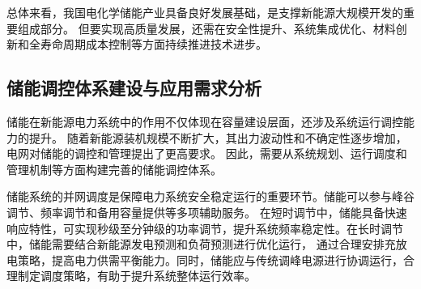 总体来看，我国电化学储能产业具备良好发展基础，是支撑新能源大规模开发的重要组成部分。
但要实现高质量发展，还需在安全性提升、系统集成优化、材料创新和全寿命周期成本控制等方面持续推进技术进步。








\subsection{储能调控体系建设与应用需求分析}

储能在新能源电力系统中的作用不仅体现在容量建设层面，还涉及系统运行调控能力的提升。
随着新能源装机规模不断扩大，其出力波动性和不确定性逐步增加，电网对储能的调控和管理提出了更高要求。
因此，需要从系统规划、运行调度和管理机制等方面构建完善的储能调控体系。

储能系统的并网调度是保障电力系统安全稳定运行的重要环节。储能可以参与峰谷调节、频率调节和备用容量提供等多项辅助服务。
在短时调节中，储能具备快速响应特性，可实现秒级至分钟级的功率调节，提升系统频率稳定性。在长时调节中，储能需要结合新能源发电预测和负荷预测进行优化运行，
通过合理安排充放电策略，提高电力供需平衡能力。同时，储能应与传统调峰电源进行协调运行，合理制定调度策略，有助于提升系统整体运行效率。

